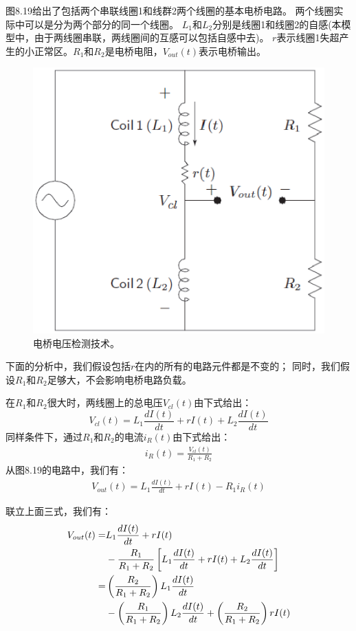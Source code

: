 图8.19给出了包括两个串联线圈1和线群2两个线圈的基本电桥电路。
两个线圈实际中可以是分为两个部分的同一个线圈。
$L_1$和$L_2$分别是线圈1和线圈2的自感(本模型中，由于两线圈串联，两线圈间的互感可以包括自感中去)。
$r$表示线圈1失超产生的小正常区。$R_1$和$R_2$是电桥电阻，$V_{out}(t)$表示电桥输出。

\begin{figure}
	\centering
	\includegraphics[scale=0.6]{chpt8/figs/fig8.19.eps}
	\caption{电桥电压检测技术。}
\end{figure}

下面的分析中，我们假设包括$r$在内的所有的电路元件都是不变的；
同时，我们假设$R_1$和$R_2$足够大，不会影响电桥电路负载。

在$R_1$和$R_2$很大时，两线圈上的总电压$V_{cl}(t)$由下式给出：
\begin{equation}%
V_{cl}(t)=L_1\frac{dI(t)}{dt}+rI(t)+L_2\frac{dI(t)}{dt}
\end{equation}
同样条件下，通过$R_1$和$R_2$的电流$i_R(t)$由下式给出：
\begin{align*}%
i_R(t)=\frac{V_{cl}(t)}{R_1+R_2} \tag{8.66b}
\end{align*}
从图8.19的电路中，我们有：
\begin{align*}%
V_{out}(t)=L_1\frac{dI(t)}{dt}+rI(t)-R_1i_R(t) \tag{8.66c}
\end{align*}

联立上面三式，我们有：
\begin{align}%
V_{out}(t)=&L_1\frac{dI(t)}{dt}+rI(t) \\\notag
&-\frac{R_1}{R_1+R_2}\left[L_1\frac{dI(t)}{dt}+rI(t)+L_2\frac{dI(t)}{dt}\right] \\\notag
=&\left(\frac{R_2}{R_1+R_2}\right)L_1\frac{dI(t)}{dt} \\\notag
&-\left(\frac{R_1}{R_1+R_2}\right)L_2\frac{dI(t)}{dt}+\left(\frac{R_2}{R_1+R_2}\right)rI(t)
\end{align}

